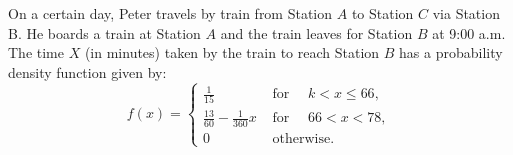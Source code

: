 \documentclass[letterpaper,10pt,addpoints]{exam}
\begin{document}


\newpage
\begin{questions}

\question[45]
On a certain day, Peter travels by train from Station $A$ to Station $C$ via Station B. He boards a train at Station $A$ and the train leaves for Station $B$ at 9:00 a.m. The time $X$ (in minutes) taken by the train to reach Station $B$ has a probability density function given by:
$$
f(x)= \begin{cases}\frac{1}{15} & \text { for } \quad k<x \leq 66, \\ \frac{13}{60}-\frac{1}{360} x & \text { for } \quad 66<x<78, \\ 0 & \text { otherwise. }\end{cases}
$$
\begin{parts}

\end{parts}
\end{questions}
\end{document}

